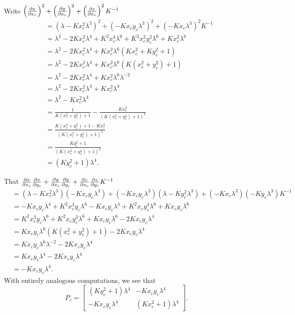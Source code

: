 \documentclass[newpage,hints,handout,12pt,noauthor,nooutcomes]{ximera}
\begin{document}
\begin{problem}
\begin{freeResponse}
  Write $\left(\pp[x]{x_c}\right)^2 + \left(\pp[y]{x_c}\right)^2 +\left(\pp[z]{x_c}\right)^2K^{-1}$
    \begin{align*}
      &= \left(\lambda -Kx_c^2 \lambda^3\right)^2 + \left(-Kx_cy_c \lambda^3\right)^2 + \left(-Kx_c \lambda^3\right)^2K^{-1}\\
      &= \lambda^2 - 2Kx_c^2\lambda^4 + K^2x_c^4 \lambda^6+ K^2x_c^2y_c^2\lambda^6 + Kx_c^2\lambda^6\\
      &= \lambda^2 - 2Kx_c^2\lambda^4 + Kx_c^2\lambda^6\left(Kx_c^2 + Ky_c^2 + 1\right)\\
      &= \lambda^2 - 2Kx_c^2\lambda^4 + Kx_c^2\lambda^6\left(K\left(x_c^2 + y_c^2\right) + 1\right)\\
      &= \lambda^2 - 2Kx_c^2\lambda^4 + Kx_c^2\lambda^6 \lambda^{-2}\\
      &= \lambda^2 - 2Kx_c^2\lambda^4 + Kx_c^2\lambda^4\\
      &= \lambda^2 - Kx_c^2\lambda^4\\
      &= \frac{1}{K\left(x_c^2+y_c^2\right)+1} - \frac{Kx_c^2}{\left(K\left(x_c^2+y_c^2\right)+1\right)^2}\\
      &= \frac{K\left(x_c^2 + y_c^2\right) +1 - Kx_c^2}{\left(K\left(x_c^2+y_c^2\right)+1\right)^2}\\
      &= \frac{Ky_c^2+1}{\left(K\left(x_c^2+y_c^2\right)+1\right)^2}\\
      &= \left(Ky_c^2+1\right)\lambda^4.
    \end{align*}
    
    That $\pp[x]{x_c}\pp[x]{y_c} + \pp[y]{x_c}\pp[y]{y_c} + \pp[z]{x_c}\pp[z]{y_c} K^{-1}$
    \begin{align*}
      &=\left(\lambda -Kx_c^2 \lambda^3\right)\left(-Kx_cy_c \lambda^3\right) + \left(-Kx_cy_c \lambda^3\right)\left(\lambda - Ky_c^2 \lambda^3\right) + \left(-Kx_c \lambda^3\right)\left(-Ky_c \lambda^3\right)K^{-1}\\
      &= -Kx_cy_c\lambda^4+K^2x_c^3y_c\lambda^6-Kx_cy_c\lambda^4+K^2x_cy_c^3\lambda^6+Kx_cy_c\lambda^6\\
      &= K^2x_c^3y_c\lambda^6+K^2x_cy_c^3\lambda^6+Kx_cy_c\lambda^6 -2Kx_cy_c\lambda^4\\
      &= Kx_cy_c\lambda^6\left(K\left(x_c^2 + y_c^2\right) + 1\right)-2Kx_cy_c\lambda^4\\
      &= Kx_cy_c\lambda^6\lambda^{-2} -2Kx_cy_c\lambda^4\\
      &= Kx_cy_c\lambda^4 -2Kx_cy_c\lambda^4\\
      &= -Kx_cy_c\lambda^4.
    \end{align*}
    With entirely analogous computations, we see that 
    \[
     P_c =
     \begin{bmatrix}
       \left(Ky_c^2+1\right)\lambda^4 & -Kx_{c}y_{c}\lambda^4\\
       -Kx_{c}y_{c}\lambda^4 & \left(Kx_c^2+1\right)\lambda^4
     \end{bmatrix}.
     \]
  \end{freeResponse}
\end{problem}
\end{document}
